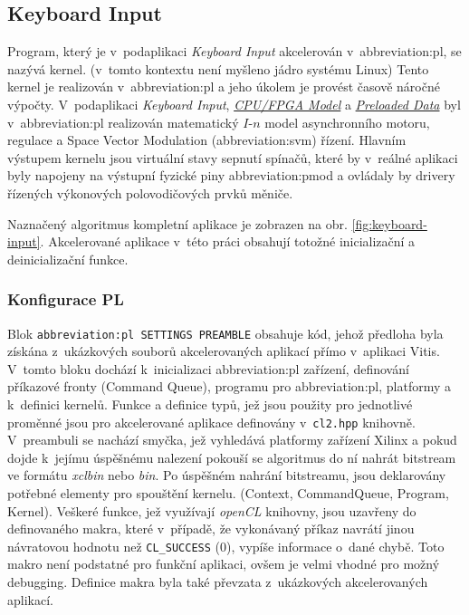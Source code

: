 \documentclass[a4paper, twoside, 11pt]{article}
\newcommand{\fbar}{\FloatBarrier}
\begin{document}
	\fbar
	\subsection{Keyboard Input}\label{subsec:keyboard-input}
		Program, který je v~podaplikaci \textit{Keyboard Input} akcelerován v~\gls{abbreviation:pl}, se nazývá kernel. (v~tomto kontextu není myšleno jádro systému Linux) Tento kernel je realizován v~\gls{abbreviation:pl} a jeho úkolem je provést časově náročné výpočty. V~podaplikaci \textit{Keyboard Input}, \hyperref[subsec:cpu-fpga]{\textit{CPU/FPGA Model}} a \hyperref[subsec:preloaded-data]{\textit{Preloaded Data}} byl v~\gls{abbreviation:pl} realizován matematický $I$-$n$ model asynchronního motoru, regulace a Space Vector Modulation (\gls{abbreviation:svm}) řízení. Hlavním výstupem kernelu jsou virtuální stavy sepnutí spínačů, které by v~reálné aplikaci byly napojeny na výstupní fyzické piny \gls{abbreviation:pmod} a ovládaly by drivery řízených výkonových polovodičových prvků měniče.\par
		Naznačený algoritmus kompletní aplikace je zobrazen na obr. \ref{fig:keyboard-input}. Akcelerované aplikace v~této práci obsahují totožné inicializační a deinicializační funkce.\par
		\subsubsection{Konfigurace PL}
		Blok \texttt{\gls{abbreviation:pl} SETTINGS PREAMBLE} obsahuje kód, jehož předloha byla získána z~ukázkových souborů akcelerovaných aplikací přímo v~aplikaci Vitis. V~tomto bloku dochází k~inicializaci \gls{abbreviation:pl} zařízení, definování příkazové fronty (Command Queue), programu pro \gls{abbreviation:pl}, platformy a k~definici kernelů. Funkce a definice typů, jež jsou použity pro jednotlivé proměnné jsou pro akcelerované aplikace definovány v~\texttt{cl2.hpp} knihovně. V~preambuli se nachází smyčka, jež vyhledává platformy zařízení Xilinx a pokud dojde k~jejímu úspěšnému nalezení pokouší se algoritmus do ní nahrát bitstream ve formátu \textit{xclbin} nebo \textit{bin}. Po úspěšném nahrání bitstreamu, jsou deklarovány potřebné elementy pro spouštění kernelu. (Context, CommandQueue, Program, Kernel). Veškeré funkce, jež využívají \textit{openCL} knihovny, jsou uzavřeny do definovaného makra, které v~případě, že vykonávaný příkaz navrátí jinou návratovou hodnotu než \texttt{CL\_SUCCESS} (0), vypíše informace o~dané chybě. Toto makro není podstatné pro funkční aplikaci, ovšem je velmi vhodné pro možný debugging. Definice makra byla také převzata z~ukázkových akcelerovaných aplikací.
\end{document}
